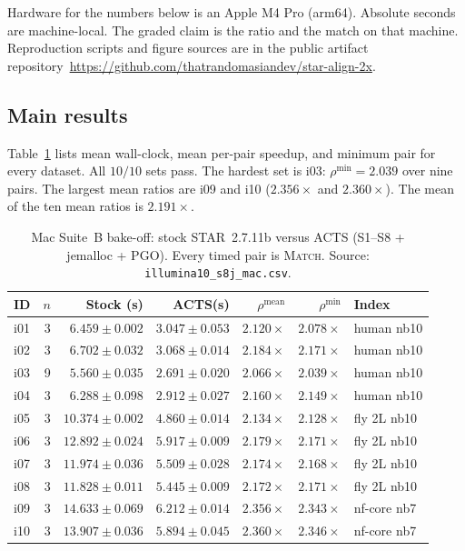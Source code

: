 \documentclass[11pt]{article}
\newcommand{\STAR}{STAR\xspace}
\newcommand{\ACTS}{ACTS\xspace}
\begin{document}
Hardware for the numbers below is an Apple M4 Pro (arm64).
Absolute seconds are machine-local.
The graded claim is the ratio and the match on that machine.
Reproduction scripts and figure sources are in the public artifact
repository~\url{https://github.com/thatrandomasiandev/star-align-2x}.

\subsection{Main results}
\label{sec:results}

Table~\ref{tab:suiteb} lists mean wall-clock, mean per-pair speedup, and
minimum pair for every dataset.
All $10/10$ sets pass.
The hardest set is i03: $\rho^{\min}=2.039$ over nine pairs.
The largest mean ratios are i09 and i10 ($2.356\times$ and $2.360\times$).
The mean of the ten mean ratios is $2.191\times$.

\begin{table}[t]
\centering
\caption{Mac Suite~B bake-off: stock \STAR~2.7.11b versus \ACTS
(S1--S8 + jemalloc + PGO).
Every timed pair is \textsc{Match}.
Source: \texttt{illumina10\_s8j\_mac.csv}.}
\label{tab:suiteb}
\scriptsize
\setlength{\tabcolsep}{3.5pt}
\begin{tabular}{@{}lrrrrrl@{}}
\toprule
ID & $n$ & Stock (s) & \ACTS (s) & $\rho^{\mathrm{mean}}$ & $\rho^{\min}$ & Index \\
\midrule
i01 & 3 & $6.459{\pm}0.002$ & $3.047{\pm}0.053$ & $2.120\times$ & $2.078\times$ & human nb10 \\
i02 & 3 & $6.702{\pm}0.032$ & $3.068{\pm}0.014$ & $2.184\times$ & $2.171\times$ & human nb10 \\
i03 & 9 & $5.560{\pm}0.035$ & $2.691{\pm}0.020$ & $2.066\times$ & $2.039\times$ & human nb10 \\
i04 & 3 & $6.288{\pm}0.098$ & $2.912{\pm}0.027$ & $2.160\times$ & $2.149\times$ & human nb10 \\
i05 & 3 & $10.374{\pm}0.002$ & $4.860{\pm}0.014$ & $2.134\times$ & $2.128\times$ & fly 2L nb10 \\
i06 & 3 & $12.892{\pm}0.024$ & $5.917{\pm}0.009$ & $2.179\times$ & $2.171\times$ & fly 2L nb10 \\
i07 & 3 & $11.974{\pm}0.036$ & $5.509{\pm}0.028$ & $2.174\times$ & $2.168\times$ & fly 2L nb10 \\
i08 & 3 & $11.828{\pm}0.011$ & $5.445{\pm}0.009$ & $2.172\times$ & $2.171\times$ & fly 2L nb10 \\
i09 & 3 & $14.633{\pm}0.069$ & $6.212{\pm}0.014$ & $2.356\times$ & $2.343\times$ & nf-core nb7 \\
i10 & 3 & $13.907{\pm}0.036$ & $5.894{\pm}0.045$ & $2.360\times$ & $2.346\times$ & nf-core nb7 \\
\bottomrule
\end{tabular}
\end{table}
\end{document}
